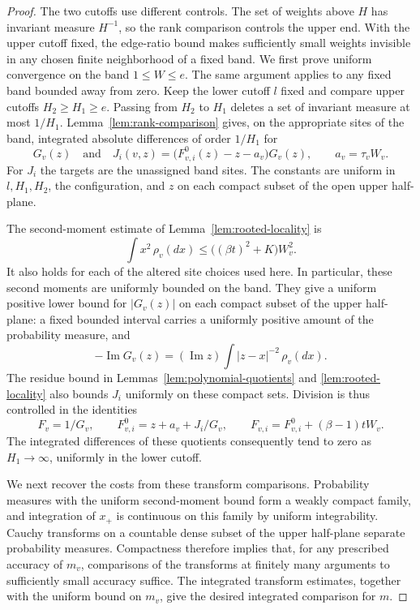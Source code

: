 \begin{proof}
The two cutoffs use different controls. The set of weights above $H$ has
invariant measure $H^{-1}$, so the rank comparison controls the upper
end. With the upper cutoff fixed, the edge-ratio bound makes sufficiently
small weights invisible in any chosen finite neighborhood of a fixed band.
We first prove uniform convergence on the band $1\leq W\leq e$.  The same
argument applies to any fixed band bounded away from zero.  Keep the lower
cutoff $l$ fixed and compare upper cutoffs $H_2\geq H_1\geq e$.  Passing
from $H_2$ to $H_1$ deletes a set of invariant measure at most $1/H_1$.
Lemma~\ref{lem:rank-comparison} gives, on the appropriate sites of the band,
integrated absolute differences of order $1/H_1$ for
\[
 G_v(z)
 \quad\text{and}\quad
 J_i(v,z)=\bigl(F_{v,i}^0(z)-z-a_v\bigr)G_v(z),
 \qquad a_v=\tau_vW_v.
\]
For $J_i$ the targets are the unassigned band sites.  The constants are
uniform in $l,H_1,H_2$, the configuration, and $z$ on each compact subset
of the open upper half-plane.

The second-moment estimate of Lemma~\ref{lem:rooted-locality} is
\begin{equation}
 \int x^2\,\rho_v(dx)
       \leq\bigl((\beta t)^2+K\bigr)W_v^2.
 \label{eq:coloring-second-moment}
\end{equation}
It also holds for each of the altered site choices used here.  In
particular, these second moments are uniformly bounded on the band.  They
give a uniform positive lower bound for $|G_v(z)|$ on each compact subset
of the upper half-plane: a fixed bounded interval carries a uniformly
positive amount of the probability measure, and
\[
 -\operatorname{Im}G_v(z)
   =(\operatorname{Im}z)\int |z-x|^{-2}\,\rho_v(dx).
\]
The residue bound in Lemmas~\ref{lem:polynomial-quotients} and
\ref{lem:rooted-locality} also bounds $J_i$ uniformly on these compact
sets.  Division is thus controlled in the identities
\[
 F_v=1/G_v,
 \qquad F_{v,i}^0=z+a_v+J_i/G_v,
 \qquad F_{v,i}=F_{v,i}^0+(\beta-1)tW_v.
\]
The integrated differences of these quotients consequently tend to zero
as $H_1\to\infty$, uniformly in the lower cutoff.

We next recover the costs from these transform comparisons.  Probability
measures with the uniform second-moment bound form a weakly compact
family, and integration of $x_+$ is continuous on this family by uniform
integrability.  Cauchy transforms on a countable dense subset of the upper
half-plane separate probability measures.  Compactness therefore implies
that, for any prescribed accuracy of $m_v$, comparisons of the transforms
at finitely many arguments to sufficiently small accuracy suffice.
The integrated transform estimates, together with the uniform bound on
$m_v$, give the desired integrated comparison for $m$.


\end{proof}
